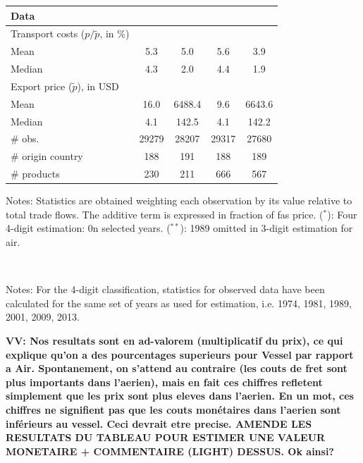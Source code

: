 \documentclass[a4paper,11pt]{article}
\begin{document}
\begin{table}[htbp]
{\begin{center}
\begin{tabular}{l|cc|cc}
    \multicolumn{5}{l}{\textbf{Data}  } \\ \hline
    Transport costs ($p/\widetilde{p}$, in \%) & & & & \\ \hline
    Mean & 5.3 & 5.0& 5.6&3.9 \\
    Median & 4.3 & 2.0 & 4.4& 1.9 \\ \hline
    Export price ($\widetilde{p}$), in USD & & & & \\
    Mean & 16.0 &	6488.4	&9.6	&6643.6 \\
    Median & 4.1	& 142.5	& 4.1	& 142.2 \\ \hline
    \# obs. & 29279 & 28207 & 29317 & 27680 \\
    \# origin country & 188 & 191 & 188 & 189 \\
    \# products & 230 & 211 & 666 & 567 \\  \hline \hline
  \end{tabular}
    \end{center}}
\parbox[l]{10cm}{\tiny{Notes: Statistics are obtained weighting each observation by its value relative to total trade flows. The additive term is expressed in fraction of fas price. ($^\ast$): Four 4-digit estimation: 0n selected years. ($^{\ast \ast}$): 1989 omitted in 3-digit estimation for air.}}\\
\parbox[l]{10cm}{\tiny{Notes: For the  4-digit classification, statistics for observed data have been calculated for the same set of years as used for estimation, i.e. 1974, 1981, 1989, 2001, 2009, 2013.}}
\end{table}%

\textbf{VV: Nos resultats sont en ad-valorem (multiplicatif du prix), ce qui explique qu’on a des pourcentages superieurs pour Vessel par rapport a Air. Spontanement, on s’attend au contraire (les couts de fret sont plus importants dans l’aerien), mais en fait ces chiffres refletent simplement que les prix sont plus eleves dans l’aerien. En un mot, ces chiffres ne signifient pas que les couts monétaires dans l’aerien sont inférieurs au vessel. Ceci devrait etre precise. AMENDE LES RESULTATS DU TABLEAU POUR ESTIMER UNE VALEUR MONETAIRE + COMMENTAIRE (LIGHT) DESSUS. Ok ainsi?}
\end{document}
